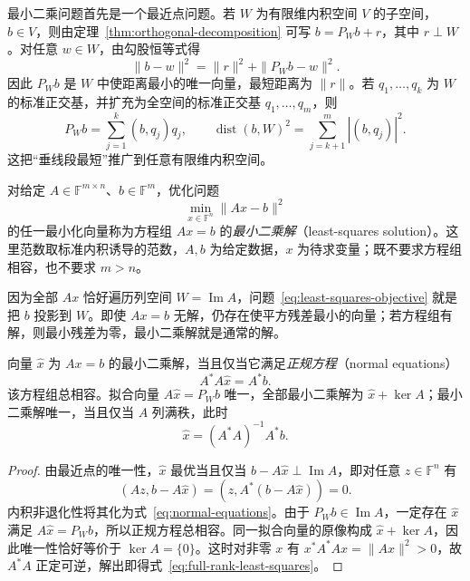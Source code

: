 最小二乘问题首先是一个最近点问题。若 $W$ 为有限维内积空间 $V$ 的子空间，$b\in V$，则由定理~\ref{thm:orthogonal-decomposition} 可写 $b=P_Wb+r$，其中 $r\perp W$。对任意 $w\in W$，由勾股恒等式得
\begin{equation}
\label{eq:projection-best-approximation}
    \|b-w\|^2=\|r\|^2+\|P_Wb-w\|^2.
\end{equation}
因此 $P_Wb$ 是 $W$ 中使距离最小的唯一向量，最短距离为 $\|r\|$。若 $q_1,\ldots,q_k$ 为 $W$ 的标准正交基，并扩充为全空间的标准正交基 $q_1,\ldots,q_m$，则
\[
    P_Wb=\sum_{j=1}^k(b,q_j)q_j,\qquad
    \operatorname{dist}(b,W)^2=\sum_{j=k+1}^m|(b,q_j)|^2.
\]
这把“垂线段最短”推广到任意有限维内积空间。

\begin{definition}
对给定 $A\in\mathbb F^{m\times n}$、$b\in\mathbb F^m$，优化问题
\begin{equation}
\label{eq:least-squares-objective}
    \min_{x\in\mathbb F^n}\|Ax-b\|^2
\end{equation}
的任一最小化向量称为方程组 $Ax=b$ 的\emph{最小二乘解}（least-squares solution）。这里范数取标准内积诱导的范数，$A,b$ 为给定数据，$x$ 为待求变量；既不要求方程组相容，也不要求 $m>n$。
\end{definition}

因为全部 $Ax$ 恰好遍历列空间 $W=\operatorname{Im}A$，问题~\eqref{eq:least-squares-objective} 就是把 $b$ 投影到 $W$。即使 $Ax=b$ 无解，仍存在使平方残差最小的向量；若方程组有解，则最小残差为零，最小二乘解就是通常的解。

\begin{theorem}[正规方程]
\label{thm:normal-equations}
向量 $\widehat x$ 为 $Ax=b$ 的最小二乘解，当且仅当它满足\emph{正规方程}（normal equations）
\begin{equation}
\label{eq:normal-equations}
    A^*A\widehat x=A^*b.
\end{equation}
该方程组总相容。拟合向量 $A\widehat x=P_Wb$ 唯一，全部最小二乘解为 $\widehat x+\ker A$；最小二乘解唯一，当且仅当 $A$ 列满秩，此时
\begin{equation}
\label{eq:full-rank-least-squares}
    \widehat x=(A^*A)^{-1}A^*b.
\end{equation}
\end{theorem}
\begin{proof}
由最近点的唯一性，$\widehat x$ 最优当且仅当 $b-A\widehat x\perp\operatorname{Im}A$，即对任意 $z\in\mathbb F^n$ 有
\[
    (Az,b-A\widehat x)=(z,A^*(b-A\widehat x))=0.
\]
内积非退化性将其化为式~\eqref{eq:normal-equations}。由于 $P_Wb\in\operatorname{Im}A$，一定存在 $\widehat x$ 满足 $A\widehat x=P_Wb$，所以正规方程总相容。同一拟合向量的原像构成 $\widehat x+\ker A$，因此唯一性恰好等价于 $\ker A=\{0\}$。这时对非零 $x$ 有 $x^*A^*Ax=\|Ax\|^2>0$，故 $A^*A$ 正定可逆，解出即得式~\eqref{eq:full-rank-least-squares}。
\end{proof}

